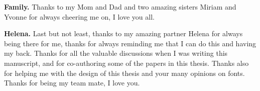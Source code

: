 \textbf{Family.} Thanks to my Mom and Dad and two amazing sisters Miriam and Yvonne for always cheering me on, I love you all.

\textbf{Helena.} Last but not least, thanks to my amazing partner Helena for always being there for me, thanks for always reminding me that I can do this and having my back. Thanks for all the valuable discussions when I was writing this manuscript, and for co-authoring some of the papers in this thesis. Thanks also for helping me with the design of this thesis and your many opinions on fonts. Thanks for being my team mate, I love you.
